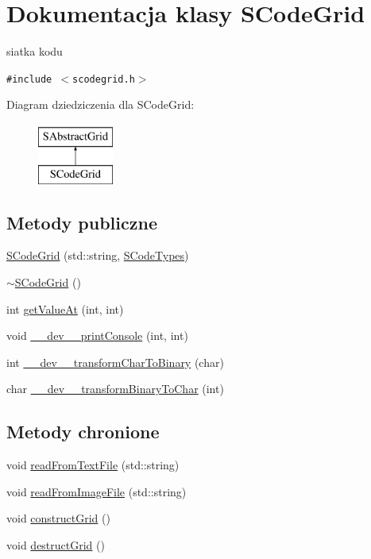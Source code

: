 \hypertarget{classSCodeGrid}{
\section{Dokumentacja klasy SCodeGrid}
\label{classSCodeGrid}
}
siatka kodu  


{\tt \#include $<$scodegrid.h$>$}

Diagram dziedziczenia dla SCodeGrid:\begin{figure}[H]
\begin{center}
\leavevmode
\includegraphics[height=2cm]{classSCodeGrid}
\end{center}
\end{figure}
\subsection*{Metody publiczne}
\begin{CompactItemize}
\item 
\hyperlink{classSCodeGrid_e430762ac9855cd60f8d5a57c46428b9}{SCodeGrid} (std::string, \hyperlink{senums_8h_1a2ae45552936d27425f99e1c187b043}{SCodeTypes})
\item 
\hyperlink{classSCodeGrid_c150afdd8f27785b5ddf5669a4d90332}{$\sim$SCodeGrid} ()
\item 
int \hyperlink{classSCodeGrid_c57d52a49a55c91068fe0eb541e721f8}{getValueAt} (int, int)
\item 
void \hyperlink{classSCodeGrid_c01feeae87539b97aed07d67b975f174}{\_\-\_\-dev\_\-\_\-printConsole} (int, int)
\item 
int \hyperlink{classSCodeGrid_c5754181e1266e23935d84f3beeb5979}{\_\-\_\-dev\_\-\_\-transformCharToBinary} (char)
\item 
char \hyperlink{classSCodeGrid_75d1d340ee3c5704527e793f2e71e93b}{\_\-\_\-dev\_\-\_\-transformBinaryToChar} (int)
\end{CompactItemize}
\subsection*{Metody chronione}
\begin{CompactItemize}
\item 
void \hyperlink{classSCodeGrid_9daa13298d0f41c18629f3fbad8b2a85}{readFromTextFile} (std::string)
\item 
void \hyperlink{classSCodeGrid_47cd37dd8ae964b4fbec965a9345de61}{readFromImageFile} (std::string)
\item 
void \hyperlink{classSCodeGrid_f15ba156433f88a40887e5ba72d9201a}{constructGrid} ()
\item 
void \hyperlink{classSCodeGrid_6bd4c1bf841bd09c2ffb2e019c08b4ed}{destructGrid} ()
\end{CompactItemize}
